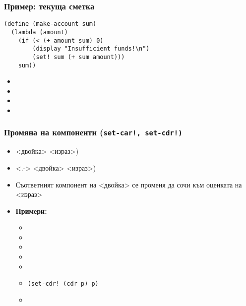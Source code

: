 \documentclass[alsotrans]{beamerswitch}
\begin{document}
\begin{frame}[fragile]
  \frametitle{Пример: текуща сметка}

\begin{lstlisting}
(define (make-account sum)
  (lambda (amount)
    (if (< (+ amount sum) 0)
        (display "Insufficient funds!\n")
        (set! sum (+ sum amount)))
    sum))
\end{lstlisting}
  \onslide<+->
  \begin{itemize}[<+->]
  \item {}
  \item {}
  \item {}
  \item {}
  \end{itemize}
\end{frame}

\begin{frame}
  \frametitle{Промяна на компоненти (\tt{set-car!}, \tt{set-cdr!})}

  \begin{itemize}[<+->]
  \item {} <двойка> <израз>\tta)
  \item<.->  <двойка> <израз>\tta)
  \item Съответният компонент на <двойка> се променя да сочи към оценката на <израз>
  \item \textbf{Примери:}
    \begin{itemize}
    \item {}
    \item {}
    \item {}
    \item {}
    \item {}
    \item \tt{(set-cdr! (cdr p) p)}
    \item {}
    \end{itemize}
  \end{itemize}
\end{frame}
\end{document}
